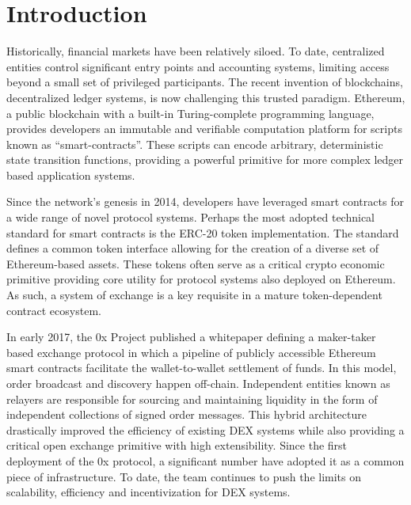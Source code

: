 \documentclass[10pt]{article}
\begin{document}

\tableofcontents
\pagebreak


\section{Introduction}\label{intro}
Historically, financial markets have been relatively siloed. To date, centralized entities control significant entry points and accounting systems, limiting access beyond a small set of privileged participants. The recent invention of blockchains, decentralized ledger systems, is now challenging this trusted paradigm. Ethereum, a public blockchain with a built-in Turing-complete programming language, provides developers an immutable and verifiable computation platform for scripts known as “smart-contracts”. These scripts can encode arbitrary, deterministic state transition functions, providing a powerful primitive for more complex ledger based application systems.
\medskip

Since the network’s genesis in 2014, developers have leveraged smart contracts for a wide range of novel protocol systems. Perhaps the most adopted technical standard for smart contracts is the ERC-20 token implementation. The standard defines a common token interface allowing for the creation of a diverse set of Ethereum-based assets. These tokens often serve as a critical crypto economic primitive providing core utility for protocol systems also deployed on Ethereum. As such, a system of exchange is a key requisite in a mature token-dependent contract ecosystem.
\medskip

In early 2017, the 0x Project published a whitepaper defining a maker-taker based exchange  protocol in which a pipeline of publicly accessible Ethereum smart contracts facilitate the wallet-to-wallet settlement of funds. In this model, order broadcast and discovery happen off-chain. Independent entities known as relayers are responsible for sourcing and maintaining liquidity in the form of independent collections of signed order messages. This hybrid architecture drastically improved the efficiency of existing DEX systems while also providing a critical open exchange primitive with high extensibility. Since the first deployment of the 0x protocol, a significant number have adopted it as a common piece of infrastructure. To date, the team continues to push the limits on scalability, efficiency and incentivization for DEX systems.
\medskip
\end{document}
